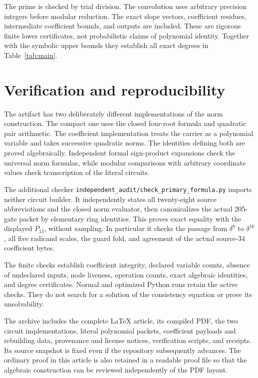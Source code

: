 \documentclass[11pt]{article}
\theoremstyle{definition}
\theoremstyle{remark}
\newcommand{\code}[1]{\nolinkurl{#1}}
\begin{document}
The prime is checked by trial division. The convolution uses arbitrary
precision integers before modular reduction. The exact slope vectors,
coefficient residues, intermediate coefficient bounds, and outputs are
included. These are rigorous finite lower certificates, not probabilistic
claims of polynomial identity. Together with the symbolic upper bounds
they establish all exact degrees in Table~\ref{tab:main}.

\section{Verification and reproducibility}
\label{sec:verification}

The artifact has two deliberately different implementations of the norm
construction. The compact one uses the closed four-root formula and
quadratic pair arithmetic. The coefficient implementation treats the
carrier as a polynomial variable and takes successive quadratic norms.
The identities defining both are proved algebraically. Independent
formal sign-product expansions check the universal norm formulas, while
modular comparisons with arbitrary coordinate values check transcription
of the literal circuits.

The additional checker
\code{independent_audit/check_primary_formula.py} imports neither circuit
builder. It independently states all twenty-eight source abbreviations
and the closed norm evaluator, then canonicalizes the actual 205-gate
packet by elementary ring identities. This proves exact equality with
the displayed \(P_{13}\), without sampling. In particular it checks the
passage from \(\delta^8\) to \(\delta^{16}\), all five radicand scales,
the guard fold, and agreement of the actual source-34 coefficient bytes.

The finite checks establish coefficient integrity, declared variable
counts, absence of undeclared inputs, node liveness, operation counts,
exact algebraic identities, and degree certificates. Normal and optimized
Python runs retain the active checks. They do not search for a solution
of the consistency equation or prove its unsolvability.

The archive includes the complete LaTeX article, its compiled PDF,
the two circuit implementations, literal polynomial packets, coefficient
payloads and rebuilding data, provenance and license notices, verification
scripts, and receipts. Its source snapshot is fixed even if the repository
subsequently advances. The ordinary proof in this article is also retained
in a readable proof file so that the algebraic construction can be reviewed
independently of the PDF layout.
\end{document}
